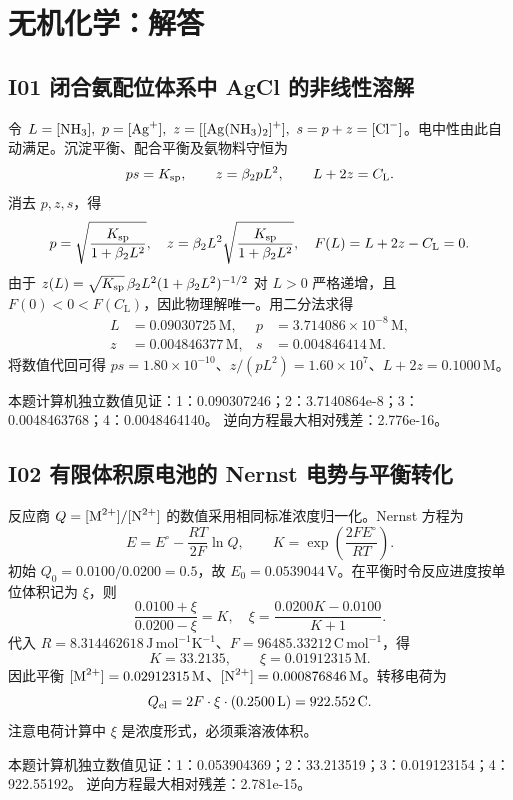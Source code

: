 \documentclass[UTF8,openany,11pt,a4paper]{ctexbook}
\begin{document}
\chapter{无机化学：解答}
\section{I01 \quad 闭合氨配位体系中 AgCl 的非线性溶解}
令 \(L=[\ce{NH3}],\ p=[\ce{Ag+}],\ z=[\ce{[Ag(NH3)2]+}],\ s=p+z=[\ce{Cl-}]\)。电中性由此自动满足。沉淀平衡、配合平衡及氨物料守恒为
\[
ps=K_{\rm sp},\qquad z=\beta_2pL^2,\qquad L+2z=C_{\mathrm L}.
\]
消去 \(p,z,s\)，得
\[
p=\sqrt{\frac{K_{\rm sp}}{1+\beta_2L^2}},\quad
z=\beta_2L^2\sqrt{\frac{K_{\rm sp}}{1+\beta_2L^2}},
\quad
F(L)=L+2z-C_{\mathrm L}=0.
\]
由于 \(z(L)=\sqrt{K_{\rm sp}}\,\beta_2L^2(1+\beta_2L^2)^{-1/2}\) 对 \(L>0\) 严格递增，且 \(F(0)<0<F(C_{\mathrm L})\)，因此物理解唯一。用二分法求得
\[
\begin{aligned}
L&=0.09030725\,\mathrm M, &
p&=3.714086\times10^{-8}\,\mathrm M,\\
z&=0.004846377\,\mathrm M, &
s&=0.004846414\,\mathrm M.
\end{aligned}
\]
将数值代回可得 \(ps=1.80\times10^{-10}\)、\(z/(pL^2)=1.60\times10^7\)、\(L+2z=0.1000\,\mathrm M\)。
\begin{reviewnote}
本题计算机独立数值见证：1：0.090307246；2：3.7140864e-8；3：0.0048463768；4：0.0048464140。
逆向方程最大相对残差：2.776e-16。
\end{reviewnote}
\section{I02 \quad 有限体积原电池的 Nernst 电势与平衡转化}
反应商 \(Q=[\ce{M^{2+}}]/[\ce{N^{2+}}]\) 的数值采用相同标准浓度归一化。Nernst 方程为
\[
E=E^\circ-\frac{RT}{2F}\ln Q,\qquad
K=\exp\!\left(\frac{2FE^\circ}{RT}\right).
\]
初始 \(Q_0=0.0100/0.0200=0.5\)，故 \(E_0=0.0539044\,\mathrm V\)。在平衡时令反应进度按单位体积记为 \(\xi\)，则
\[
\frac{0.0100+\xi}{0.0200-\xi}=K,\quad
\xi=\frac{0.0200K-0.0100}{K+1}.
\]
代入 \(R=8.314462618\,\mathrm{J\,mol^{-1}K^{-1}}\)、\(F=96485.33212\,\mathrm{C\,mol^{-1}}\)，得
\[
K=33.2135,\qquad \xi=0.01912315\,\mathrm M.
\]
因此平衡 \([\ce{M^{2+}}]=0.02912315\,\mathrm M\)、\([\ce{N^{2+}}]=0.000876846\,\mathrm M\)。转移电荷为
\[
Q_{\rm el}=2F\cdot \xi \cdot (0.2500\,\mathrm L)=922.552\,\mathrm C.
\]
注意电荷计算中 \(\xi\) 是浓度形式，必须乘溶液体积。
\begin{reviewnote}
本题计算机独立数值见证：1：0.053904369；2：33.213519；3：0.019123154；4：922.55192。
逆向方程最大相对残差：2.781e-15。
\end{reviewnote}
\end{document}
